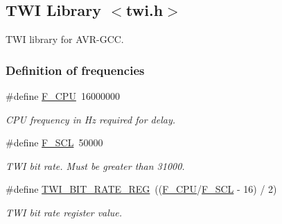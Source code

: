 \hypertarget{a00014}{}\subsection{T\+WI Library $<$twi.\+h$>$}
\label{a00014}


T\+WI library for A\+V\+R-\/\+G\+CC.  


\subsubsection*{Definition of frequencies}
\begin{DoxyCompactItemize}
\item 
\#define \hyperlink{a00014_ga43bafb28b29491ec7f871319b5a3b2f8}{F\+\_\+\+C\+PU}~16000000\hypertarget{a00014_ga43bafb28b29491ec7f871319b5a3b2f8}{}\label{a00014_ga43bafb28b29491ec7f871319b5a3b2f8}

\begin{DoxyCompactList}\small\item\em C\+PU frequency in Hz required for delay. \end{DoxyCompactList}\item 
\#define \hyperlink{a00014_ga7a1c522bed64982971384489ee477bd3}{F\+\_\+\+S\+CL}~50000\hypertarget{a00014_ga7a1c522bed64982971384489ee477bd3}{}\label{a00014_ga7a1c522bed64982971384489ee477bd3}

\begin{DoxyCompactList}\small\item\em T\+WI bit rate. Must be greater than 31000. \end{DoxyCompactList}\item 
\#define \hyperlink{a00014_ga801c158406ca2334b446e442a2debe37}{T\+W\+I\+\_\+\+B\+I\+T\+\_\+\+R\+A\+T\+E\+\_\+\+R\+EG}~((\hyperlink{a00014_ga43bafb28b29491ec7f871319b5a3b2f8}{F\+\_\+\+C\+PU}/\hyperlink{a00014_ga7a1c522bed64982971384489ee477bd3}{F\+\_\+\+S\+CL} -\/ 16) / 2)\hypertarget{a00014_ga801c158406ca2334b446e442a2debe37}{}\label{a00014_ga801c158406ca2334b446e442a2debe37}

\begin{DoxyCompactList}\small\item\em T\+WI bit rate register value. \end{DoxyCompactList}\end{DoxyCompactItemize}
